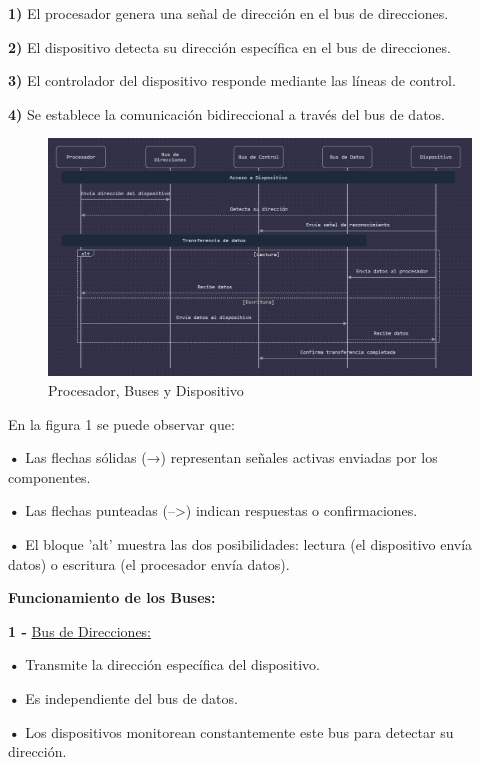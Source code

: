 \documentclass{article}
\begin{document}
\quad

\textbf{1)  } {El procesador genera una señal de dirección en el bus de direcciones.}

\textbf{2)  } {El dispositivo detecta su dirección específica en el bus de direcciones.}

\textbf{3)  } {El controlador del dispositivo responde mediante las líneas de control.}

\textbf{4)  } {Se establece la comunicación bidireccional a través del bus de datos.}

\quad

\begin{figure}[h]
    \centering
    \includegraphics[width=10cm\textwidth]{figura_01.png}
    \caption{Procesador, Buses y Dispositivo}
    \label{fig:img1}
\end{figure}

{En la figura 1 se puede observar que:}

\quad

\textbf{    •} { Las flechas sólidas (→) representan señales activas enviadas por los componentes.}

\textbf{    •} { Las flechas punteadas (-->) indican respuestas o confirmaciones.}

\textbf{    •} { El bloque 'alt' muestra las dos posibilidades: lectura (el dispositivo envía datos) o escritura (el procesador envía datos).}

\quad

\textbf{Funcionamiento de los Buses: }

\quad

\textbf{1 -  } {\underline{Bus de Direcciones: }}

\quad

\textbf{    •} { Transmite la dirección específica del dispositivo.}

\textbf{    •} { Es independiente del bus de datos.}

\textbf{    •} { Los dispositivos monitorean constantemente este bus para detectar su dirección.}
\end{document}
